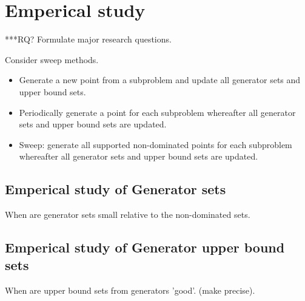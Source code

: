 \section{Emperical study}
***RQ? Formulate major research questions.

Consider sweep methods. 
\begin{itemize}
	\item 
Generate a new point from a subproblem and update all generator sets and upper bound sets.
	\item 
Periodically generate a point for each subproblem whereafter all generator sets and upper bound sets are updated.
	\item 
Sweep: generate all supported non-dominated points for each subproblem whereafter all generator sets and upper bound sets are updated.
\end{itemize}


\subsection{Emperical study of Generator sets}
When are generator sets small relative to the non-dominated sets.

\subsection{Emperical study of Generator upper bound sets}
When are upper bound sets from generators 'good'. (make precise).

	
